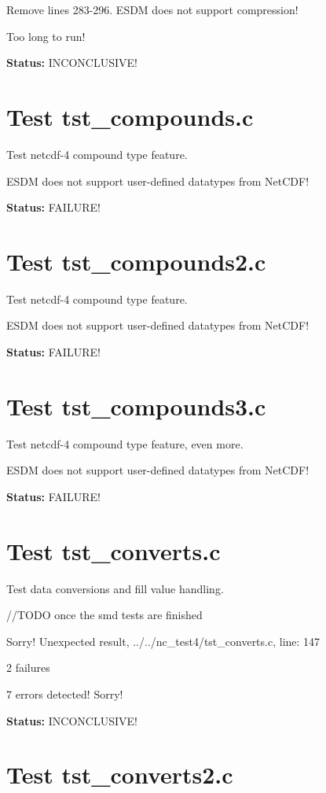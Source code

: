 Remove lines 283-296. ESDM does not support compression!

Too long to run!

{\bf \large Status: } INCONCLUSIVE!

\section{Test tst\_compounds.c}

Test netcdf-4 compound type feature.

ESDM does not support user-defined datatypes from NetCDF!

{\bf \large Status: } FAILURE!

\section{Test tst\_compounds2.c}

Test netcdf-4 compound type feature.

ESDM does not support user-defined datatypes from NetCDF!

{\bf \large Status: } FAILURE!

\section{Test tst\_compounds3.c}

Test netcdf-4 compound type feature, even more.

ESDM does not support user-defined datatypes from NetCDF!

{\bf \large Status: } FAILURE!

\section{Test tst\_converts.c}

Test data conversions and fill value handling.

//TODO once the smd tests are finished

Sorry! Unexpected result, ../../nc\_test4/tst\_converts.c, line: 147

2 failures

7 errors detected! Sorry!

{\bf \large Status: } INCONCLUSIVE!

\section{Test tst\_converts2.c}

